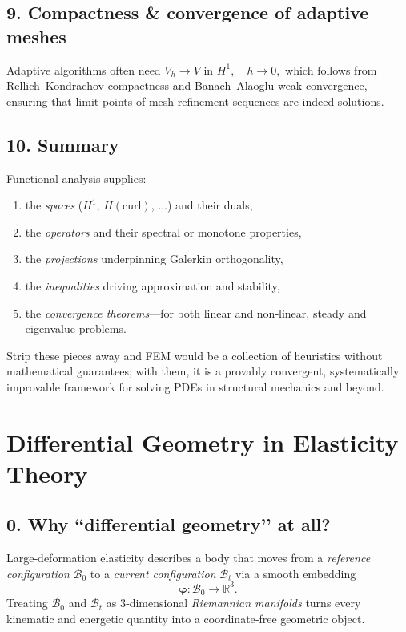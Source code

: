 \documentclass[12pt]{article}
\theoremstyle{definition} %
\theoremstyle{plain} %
\begin{document}
\subsection*{9.  Compactness \& convergence of adaptive meshes}
Adaptive algorithms often need
\(
	V_h \to V \text{ in } H^1, \quad h\!\to\!0 ,
\)
which follows from Rellich–Kondrachov compactness and Banach–Alaoglu
weak convergence, ensuring that limit points of mesh‑refinement
sequences are indeed solutions.

\subsection*{10.  Summary}
Functional analysis supplies:
\begin{enumerate}
  \item the \emph{spaces} ($H^1$, $H(\mathrm{curl})$, $\dots$) and their duals,
  \item the \emph{operators} and their spectral or monotone properties,
  \item the \emph{projections} underpinning Galerkin orthogonality,
  \item the \emph{inequalities} driving approximation and stability,
  \item the \emph{convergence theorems}—for both linear and non‑linear,
        steady and eigenvalue problems.
\end{enumerate}
Strip these pieces away and FEM would be a collection of heuristics
without mathematical guarantees; with them, it is a provably convergent,
systematically improvable framework for solving PDEs in structural
mechanics and beyond.
\section*{Differential Geometry in Elasticity Theory}

\subsection*{0.  Why “differential geometry’’ at all?}
Large‑deformation elasticity describes a body that moves from a
\emph{reference configuration} $\mathcal{B}_0$ to a
\emph{current configuration} $\mathcal{B}_t$ via a smooth embedding
\[
	\boldsymbol{\varphi}:\mathcal{B}_0 \longrightarrow \mathbb{R}^3 .
\]
Treating $\mathcal{B}_0$ and $\mathcal{B}_t$ as 3‑dimensional
\emph{Riemannian manifolds} turns every kinematic and energetic quantity
into a coordinate‑free geometric object.
\end{document}
